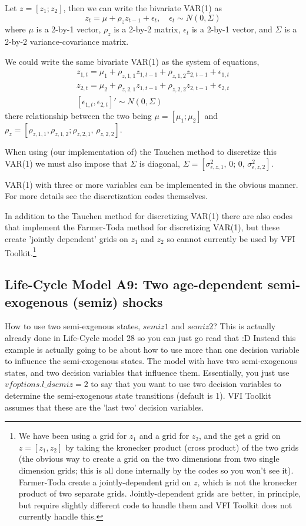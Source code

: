 Let $z=[z_1; z_2]$, then we can write the bivariate VAR(1) as
\begin{equation*}
 z_t=\mu+\rho_z z_{t-1} + \epsilon_t, \quad \epsilon_t \sim N(0,\Sigma)
\end{equation*}
where $\mu$ is a 2-by-1 vector, $\rho_z$ is a 2-by-2 matrix, $\epsilon_t$ is a 2-by-1 vector, and $\Sigma$ is a 2-by-2 variance-covariance matrix.

We could write the same bivariate VAR(1) as the system of equations,
\begin{eqnarray*}
  z_{1,t}=\mu_1+\rho_{z,1,1} z_{1,t-1} +\rho_{z,1,2} z_{2,t-1} + \epsilon_{1,t} \\
  z_{2,t}=\mu_2+\rho_{z,2,1} z_{1,t-1} +\rho_{z,2,2} z_{2,t-1} + \epsilon_{2,t} \\
  \left[ \epsilon_{1,t} , \epsilon_{2,t} \right]' \sim N(0,\Sigma)
\end{eqnarray*}
there relationship between the two being $\mu=[\mu_1; \mu_2]$ and $\rho_z=[\rho_{z,1,1}, \rho_{z,1,2}; \rho_{z,2,1},\, \rho_{z,2,2}]$.

When using (our implementation of) the Tauchen method to discretize this VAR(1) we must also impose that $\Sigma$ is diagonal, $\Sigma=[\sigma_{\epsilon,z,1}^2,\, 0; \, 0, \, \sigma_{\epsilon,z,2}^2]$.

VAR(1) with three or more variables can be implemented in the obvious manner. For more details see the discretization codes themselves.

In addition to the Tauchen method for discretizing VAR(1) there are also codes that implement the Farmer-Toda method for discretizing VAR(1), but these create 'jointly dependent' grids on $z_1$ and $z_2$ so cannot currently be used by VFI Toolkit.\footnote{We have been using a grid for $z_1$ and a grid for $z_2$, and the get a grid on $z=[z_1, z_2]$ by taking the kronecker product (cross product) of the two grids (the obvious way to create a grid on the two dimensions from two single dimension grids; this is all done internally by the codes so you won't see it). Farmer-Toda create a jointly-dependent grid on $z$, which is not the kronecker product of two separate grids. Jointly-dependent grids are better, in principle, but require slightly different code to handle them and VFI Toolkit does not currently handle this.}

\subsection{Life-Cycle Model A9: Two age-dependent semi-exogenous (semiz) shocks}
How to use two semi-exgenous states, $semiz1$ and $semiz2$? This is actually already done in Life-Cycle model 28 so you can just go read that :D Instead this example is actually going to be about how to use more than one decision variable to influence the semi-exogenous states. The model with have two semi-exogenous states, and two decision variables that influence them. Essentially, you just use $vfoptions.l\_{}dsemiz=2$ to say that you want to use two decision variables to determine the semi-exogenous state transitions (default is 1). VFI Toolkit assumes that these are the 'last two' decision variables.

